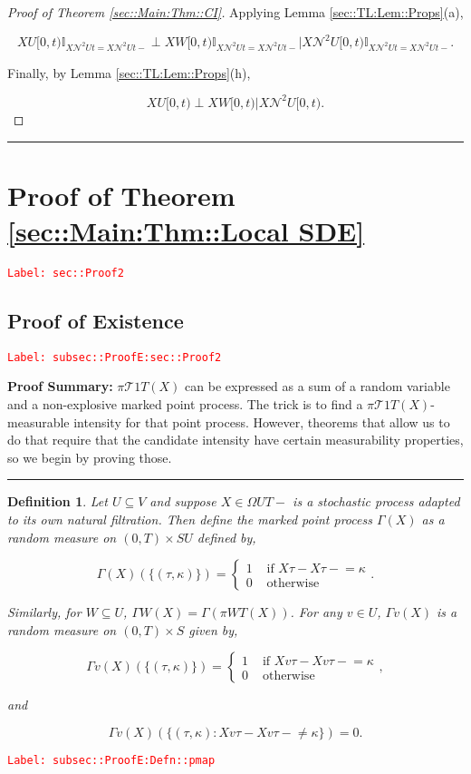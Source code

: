 \documentclass[12pt]{article}
\newcommand{\mb}{\mathbb}
\newcommand{\mc}{\mathcal}
\newcommand{\te}{\text}
\newcommand{\tr}{\textcolor{red}}
\newcommand{\labe}[1]{\tr{\texttt{Label: #1}}}
\newcommand{\pfsum}{\textbf{Proof Summary: }}
\newcommand{\lin}{\rule{\linewidth}{0.4 pt}}
\renewcommand{\v}{v}							%
\renewcommand{\U}{U}							%
\newcommand{\UU}{W}								%
\renewcommand{\S}{S}							%
\newcommand{\T}{T}								%
\renewcommand{\t}{t}							%
\newcommand{\proj}{\pi}							%
\newcommand{\X}{X}								%
\newcommand{\dneigh}{\mc{N}^2}					%
\newcommand{\tree}{\mc{T}}						%
\newcommand{\rt}{\tau}							%
\newcommand{\pmap}{\Gamma}						%
\renewcommand{\mark}{\kappa}					%
\newtheorem{defn}[thms]{Definition}
\begin{document}
\begin{proof}[Proof of Theorem \ref{sec::Main:Thm::CI}]
Applying Lemma \ref{sec::TL:Lem::Props}(a),

\[\X{\U}{[0,\t)}\mb{I}_{\X{\dneigh{\U}}{\t} = \X{\dneigh{\U}}{\t-}}\perp\X{\UU}{[0,\t)}\mb{I}_{\X{\dneigh{\U}}{\t} = \X{\dneigh{\U}}{\t-}}\big|\X{\dneigh{\U}}{[0,\t)}\mb{I}_{\X{\dneigh{\U}}{\t} = \X{\dneigh{\U}}{\t-}}.\]

Finally, by Lemma \ref{sec::TL:Lem::Props}(h),

\[\X{\U}{[0,\t)}\perp\X{\UU}{[0,\t)}\big|\X{\dneigh{\U}}{[0,\t)}.\]
\end{proof}

\lin

\section{Proof of Theorem \ref{sec::Main:Thm::Local SDE}}
\label{sec::Proof2}\labe{sec::Proof2}

\subsection{Proof of Existence}
\label{subsec::ProofE:sec::Proof2}\labe{subsec::ProofE:sec::Proof2}

\pfsum \(\proj{\tree{1}}{\T}(\X{}{})\) can be expressed as a sum of a random variable and a non-explosive marked point process. The trick is to find a \(\proj{\tree{1}}{\T}(\X{}{})\)-measurable intensity for that point process. However, theorems that allow us to do that require that the candidate intensity have certain measurability properties, so we begin by proving those.

\lin

\begin{defn}
Let \(\U\subseteq V\) and suppose \(\X{}{} \in \Omega{\U}{\T-}\) is a stochastic process adapted to its own natural filtration. Then define the marked point process \(\pmap{}(\X{}{})\) as a random measure on \((0,\T) \times \S{\U}\) defined by,

\[\pmap{}(\X{}{})(\{(\rt{},\mark{})\}) = \begin{cases}
1 &\te{ if } \X{}{\rt{}} - \X{}{\rt{}-} = \mark{}\\
0 &\te{ otherwise}
\end{cases}.\]

Similarly, for \(\UU \subseteq \U\), \(\pmap{\UU}(\X{}{}) = \pmap{}\left(\proj{\UU}{\T}(\X{}{})\right)\). For any \(\v\in \U\), \(\pmap{\v}(\X{}{})\) is a random measure on \((0,\T) \times \S\) given by,

\[\pmap{\v}(\X{}{})(\{(\rt{},\mark{})\}) = \begin{cases}
1 &\te{ if } \X{\v}{\rt{}} - \X{\v}{\rt{}-} = \mark{}\\
0 &\te{ otherwise}
\end{cases},\]

and

\[\pmap{\v}(\X{}{})(\{(\rt{},\mark{}): \X{\v}{\rt{}} - \X{\v}{\rt{}-} \neq \mark{}\}) = 0.\]
\label{subsec::ProofE:Defn::pmap}
\end{defn}
\labe{subsec::ProofE:Defn::pmap}
\end{document}
